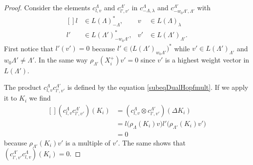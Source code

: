 \begin{proof}
    Consider the elements \( c^{\Lambda}_{l,v}\) and \( c_{l',v'}^{\Lambda'}\) in \( c^{\Lambda}_{-\Lambda,\lambda} \) and \( c^{\Lambda'}_{-w_0\Lambda',\Lambda'}\) with
    \begin{equation}
        \begin{aligned}[]
            l&\in L(\Lambda)^*_{-\Lambda},&v&\in L(\Lambda)_{\lambda}\\
            l'&\in L(\Lambda')^*_{-w_0\Lambda'},&v'&\in L(\Lambda')_{\Lambda'}.
        \end{aligned}
    \end{equation}
    First notice that \( l'(v')=0\) because \( l'\in \big( L(\Lambda')_{w_0\Lambda'} \big)^*\) while \( v'\in L(\Lambda')_{\Lambda'}\) and \( w_0\Lambda'\neq \Lambda'\). In the same way \( \rho_{\Lambda'}(X_i^+)v'=0\) since \( v'\) is a highest weight vector in \( L(\Lambda')\).

    The product \( c^{\Lambda}_{l,v}c^{\Lambda'}_{l',v'}\) is defined by the equation \eqref{subeqDualHopfmult}. If we apply it to \( K_i\) we find
    \begin{equation}
        \begin{aligned}[]
            (c^{\Lambda}_{l,v}c^{\Lambda'}_{l',v'})(K_i)&=(c^{\Lambda}_{l,v}\otimes c^{\Lambda'}_{l',v'})(\Delta K_i)\\
            &=l\big( \rho_{\Lambda}(K_i)v \big)l'\big( \rho_{\Lambda'}(K_i)v' \big)\\
            &=0
        \end{aligned}
    \end{equation}
    because \( \rho_{\Lambda'}(K_i)v'\) is a multiple of \( v'\). The same shows that \( (c^{\Lambda'}_{l',v'}c^{\Lambda}_{l,v})(K_i)=0\).


\end{proof}
